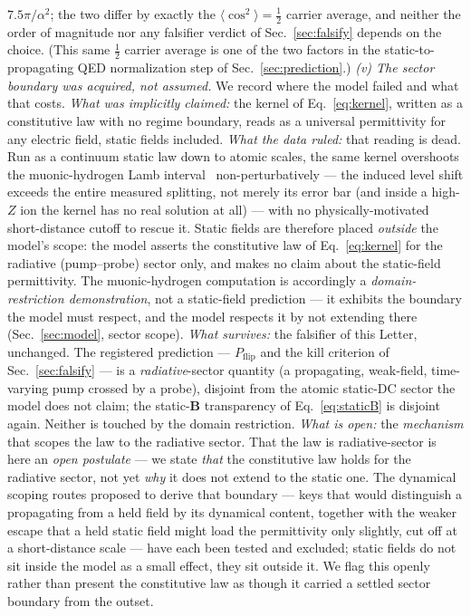 \documentclass[aps,prd,twocolumn,superscriptaddress,nofootinbib,longbibliography]{revtex4-2}
\newcommand{\Pflip}{P_{\mathrm{flip}}}
\begin{document}
$7.5\pi/\alpha^2$; the two differ by exactly the $\langle\cos^2\rangle=\tfrac12$
carrier average, and neither the order of magnitude nor any falsifier verdict of
Sec.~\ref{sec:falsify} depends on the choice. (This same $\tfrac12$ carrier
average is one of the two factors in the static-to-propagating QED normalization
step of Sec.~\ref{sec:prediction}.)
\emph{(v) The sector boundary was acquired, not assumed.} We record where the
model failed and what that costs. \emph{What was implicitly claimed:} the kernel
of Eq.~\eqref{eq:kernel}, written as a constitutive law with no regime boundary,
reads as a universal permittivity for any electric field, static fields included.
\emph{What the data ruled:} that reading is dead. Run as a continuum static law
down to atomic scales, the same kernel overshoots the muonic-hydrogen Lamb
interval~\cite{Antognini2013} non-perturbatively --- the induced level shift
exceeds the entire measured splitting, not merely its error bar (and inside a
high-$Z$ ion the kernel has no real solution at all) --- with no
physically-motivated short-distance cutoff to rescue it. Static fields are
therefore placed \emph{outside} the model's scope: the model asserts the
constitutive law of Eq.~\eqref{eq:kernel} for the radiative (pump--probe) sector
only, and makes no claim about the static-field permittivity. The
muonic-hydrogen computation is accordingly a \emph{domain-restriction
demonstration}, not a static-field prediction --- it exhibits the boundary the
model must respect, and the model respects it by not extending there
(Sec.~\ref{sec:model}, sector scope). \emph{What survives:} the falsifier of this
Letter, unchanged. The registered prediction --- $\Pflip$ and the kill criterion
of Sec.~\ref{sec:falsify} --- is a \emph{radiative}-sector quantity (a
propagating, weak-field, time-varying pump crossed by a probe), disjoint from the
atomic static-DC sector the model does not claim; the static-$\mathbf B$
transparency of Eq.~\eqref{eq:staticB} is disjoint again. Neither is touched by
the domain restriction. \emph{What is open:} the \emph{mechanism} that scopes the
law to the radiative sector. That the law is radiative-sector is here an
\emph{open postulate} --- we state \emph{that} the constitutive law holds for the
radiative sector, not yet \emph{why} it does not extend to the static one. The
dynamical scoping routes proposed to derive that boundary --- keys that would
distinguish a propagating from a held field by its dynamical content, together
with the weaker escape that a held static field might load the permittivity only
slightly, cut off at a short-distance scale --- have each been tested and
excluded; static fields do not sit inside the model as a small effect, they sit
outside it. We flag this openly rather than present the constitutive law as
though it carried a settled sector boundary from the outset.
\end{document}
